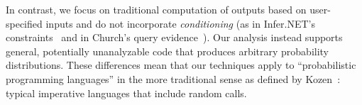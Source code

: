 
In contrast, we focus on traditional computation
of outputs based on user-specified inputs and do not incorporate
\emph{conditioning} (as in Infer.NET's constraints~\cite{infernet} and in
Church's query evidence~\cite{church}). Our analysis instead supports
general, potentially unanalyzable code that produces arbitrary
probability distributions.  These differences mean that our techniques
apply to ``probabilistic programming languages'' in the more traditional sense as defined
by Kozen~\cite{kozen}: typical imperative languages that include random calls.




